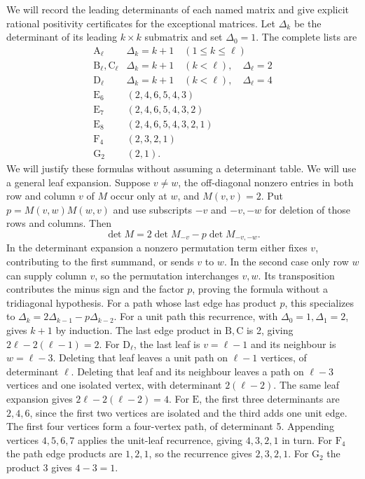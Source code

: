 \documentclass[11pt]{amsart}
\theoremstyle{definition}
\newcommand{\typ}[1]{\mathrm{#1}}
\begin{document}
We will record the leading determinants of each named matrix and give
explicit rational positivity certificates for the exceptional matrices.
Let $\Delta_k$ be the determinant of its leading $k\times k$ submatrix
and set $\Delta_0=1$. The complete lists are
\begin{equation}\label{eq:minors}
\begin{array}{c|l}
\typ A_\ell&\Delta_k=k+1\quad(1\leq k\leq\ell)\\
\typ B_\ell,\typ C_\ell&\Delta_k=k+1\quad(k<\ell),\quad\Delta_\ell=2\\
\typ D_\ell&\Delta_k=k+1\quad(k<\ell),\quad\Delta_\ell=4\\
\typ E_6&(2,4,6,5,4,3)\\
\typ E_7&(2,4,6,5,4,3,2)\\
\typ E_8&(2,4,6,5,4,3,2,1)\\
\typ F_4&(2,3,2,1)\\
\typ G_2&(2,1).
\end{array}
\end{equation}
We will justify these formulas without assuming a determinant table.
We will use a general leaf expansion. Suppose $v\ne w$, the off-diagonal nonzero
entries in both row and column $v$ of $M$ occur only at $w$, and
$M(v,v)=2$. Put $p=M(v,w)M(w,v)$ and use subscripts $-v$ and
$-v,-w$ for deletion of those rows and columns. Then
\begin{equation}\label{eq:leaf-det}
 \det M=2\det M_{-v}-p\det M_{-v,-w}.
\end{equation}
In the determinant expansion a nonzero permutation term either fixes
$v$, contributing to the first summand, or sends $v$ to $w$. In the
second case only row $w$ can supply column $v$, so the permutation
interchanges $v,w$. Its transposition contributes the minus sign and
the factor $p$, proving the formula without a tridiagonal hypothesis.
For a path whose last edge has product $p$, this specializes to
$\Delta_k=2\Delta_{k-1}-p\Delta_{k-2}$.
For a unit path this recurrence, with $\Delta_0=1,\Delta_1=2$,
gives $k+1$ by induction. The last edge product in $\typ B,\typ C$
is 2, giving $2\ell-2(\ell-1)=2$.
For $\typ D_\ell$, the last leaf is $v=\ell-1$ and its neighbour is
$w=\ell-3$. Deleting that leaf leaves a unit path on
$\ell-1$ vertices, of determinant $\ell$. Deleting that leaf and its
neighbour leaves a path on $\ell-3$ vertices and one isolated vertex,
with determinant $2(\ell-2)$. The same leaf expansion gives
$2\ell-2(\ell-2)=4$.
For $\typ E$, the first three determinants are $2,4,6$, since the
first two vertices are isolated and the third adds one unit edge.
The first four vertices form a four-vertex path, of determinant 5.
Appending vertices $4,5,6,7$ applies the unit-leaf recurrence,
giving $4,3,2,1$ in turn. For $\typ F_4$ the path edge products
are $1,2,1$, so the recurrence gives $2,3,2,1$.
For $\typ G_2$ the product 3 gives $4-3=1$.
\end{document}
